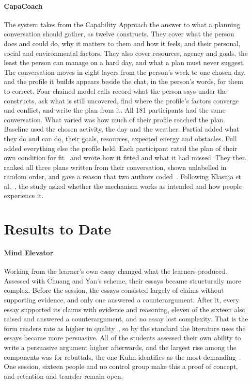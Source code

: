 \documentclass[manuscript,screen,review]{acmart}
\begin{document}
\paragraph{CapaCoach} The system takes from the Capability Approach the answer to what a planning conversation should gather, as twelve constructs. They cover what the person does and could do, why it matters to them and how it feels, and their personal, social and environmental factors. They also cover resources, agency and goals, the least the person can manage on a hard day, and what a plan must never suggest. The conversation moves in eight layers from the person's week to one chosen day, and the profile it builds appears beside the chat, in the person's words, for them to correct. Four chained model calls record what the person says under the constructs, ask what is still uncovered, find where the profile's factors converge and conflict, and write the plan from it. All 181 participants had the same conversation. What varied was how much of their profile reached the plan. Baseline used the chosen activity, the day and the weather. Partial added what they do and can do, their goals, resources, expected energy and obstacles. Full added everything else the profile held. Each participant rated the plan of their own condition for fit~\cite{weiner2017psychometric} and wrote how it fitted and what it had missed. They then ranked all three plans written from their conversation, shown unlabelled in random order, and gave a reason that two authors coded~\cite{hsieh2005three}. Following Klasnja et al.~\cite{klasnja2011evaluate}, the study asked whether the mechanism works as intended and how people experience it.

\section{Results to Date}

\paragraph{Mind Elevator} Working from the learner's own essay changed what the learners produced. Assessed with Chuang and Yan's scheme, their essays became structurally more complex. Before the session, the essays consisted largely of claims without supporting evidence, and only one answered a counterargument. After it, every essay supported its claims with evidence and reasoning, eleven of the sixteen also raised and answered a counterargument, and no essay lost complexity. That is the form readers rate as higher in quality~\cite{wolfe2009argumentation}, so by the standard the literature uses the essays became more persuasive. All of the students assessed their own ability to write a persuasive argument higher afterwards, and the largest rise among the components was for rebuttals, the one Kuhn identifies as the most demanding~\cite{kuhn1991skills}. One session, sixteen people and no control group make this a proof of concept, and retention and transfer remain open.
\end{document}
